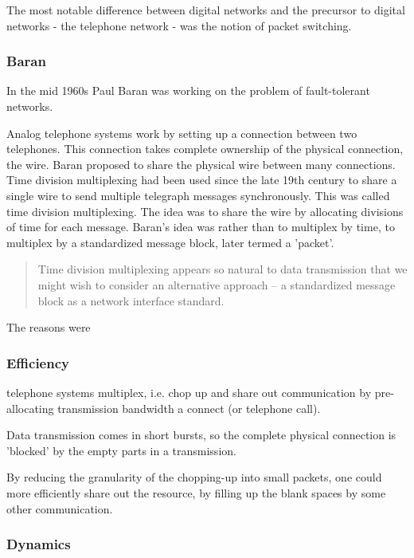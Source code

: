 The most notable difference between digital networks and the precursor to digital networks - the
telephone network - was the notion of packet switching.

\subsubsection{Baran}

In the mid 1960s Paul Baran was working on the problem of fault-tolerant networks\cite{baran1964intro}.

Analog telephone systems work by setting up a connection between two telephones. This connection
takes complete ownership of the physical connection, the wire. Baran proposed to share the physical
wire between many connections. Time division multiplexing had been used since the late 19th century
to share a single wire to send multiple telegraph messages synchronously. This was called time
division multiplexing. The idea was to share the wire by allocating divisions of time for each
message. Baran's idea was rather than to multiplex by time, to multiplex by a standardized message
block, later termed a 'packet'.

\begin{quote}
Time division multiplexing appears so natural to data transmission that we might wish to consider an
alternative approach -- a standardized message block as a network interface standard.\cite{baran1964intro}
\end{quote}

The reasons were

\subsubsection{Efficiency}

telephone systems multiplex, i.e. chop up and share out communication by pre-allocating transmission
bandwidth a connect (or telephone call).

Data transmission comes in short bursts, so the complete physical connection is 'blocked' by the
empty parts in a transmission.

By reducing the granularity of the chopping-up into small packets, one could more efficiently share
out the resource, by filling up the blank spaces by some other communication.

\subsubsection{Dynamics}

